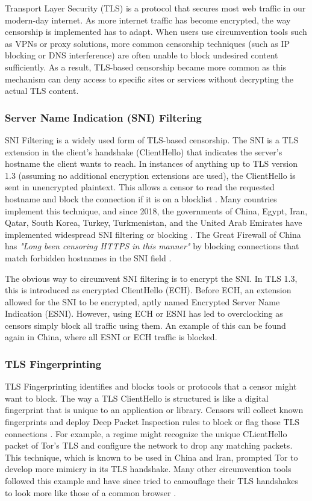 Transport Layer Security (TLS) is a protocol that secures most web traffic in our modern-day internet. As more internet traffic has become encrypted, the way censorship is implemented has to adapt. When users use circumvention tools such as VPNs or proxy solutions, more common censorship techniques (such as IP blocking or DNS interference) are often unable to block undesired content sufficiently. As a result, TLS-based censorship became more common as this mechanism can deny access to specific sites or services without decrypting the actual TLS content. 

\subsubsection{Server Name Indication (SNI) Filtering}

SNI Filtering is a widely used form of TLS-based censorship. The SNI is a TLS extension in the client's handshake (ClientHello) that indicates the server's hostname the client wants to reach. In instances of anything up to TLS version 1.3 (assuming no additional encryption extensions are used), the ClientHello is sent in unencrypted plaintext. This allows a censor to read the requested hostname and block the connection if it is on a blocklist \cite{SNIUnencryptedCloudFlare}. Many countries implement this technique, and since 2018, the governments of China, Egypt, Iran, Qatar, South Korea, Turkey, Turkmenistan, and the United Arab Emirates have implemented widespread SNI filtering or blocking \cite{rfc9505SNIBlocking}. The Great Firewall of China has \textit{"Long been censoring HTTPS in this manner"} by blocking connections that match forbidden hostnames in the SNI field \cite{GreatFirewallSNI}. 

The obvious way to circumvent SNI filtering is to encrypt the SNI. In TLS 1.3, this is introduced as encrypted ClientHello (ECH). Before ECH, an extension allowed for the SNI to be encrypted, aptly named Encrypted Server Name Indication (ESNI). However, using ECH or ESNI has led to overclocking as censors simply block all traffic using them. An example of this can be found again in China, where all ESNI or ECH traffic is blocked.

\subsubsection{TLS Fingerprinting}

TLS Fingerprinting identifies and blocks tools or protocols that a censor might want to block. The way a TLS ClientHello is structured is like a digital fingerprint that is unique to an application or library. Censors will collect known fingerprints and deploy Deep Packet Inspection rules to block or flag those TLS connections \cite{TLSFingerprinting}. For example, a regime might recognize the unique CLientHello packet of Tor's TLS and configure the network to drop any matching packets. This technique, which is known to be used in China and Iran, prompted Tor to develop more mimicry in its TLS handshake. Many other circumvention tools followed this example and have since tried to camouflage their TLS handshakes to look more like those of a common browser \cite{TLSFingerprinting}.

